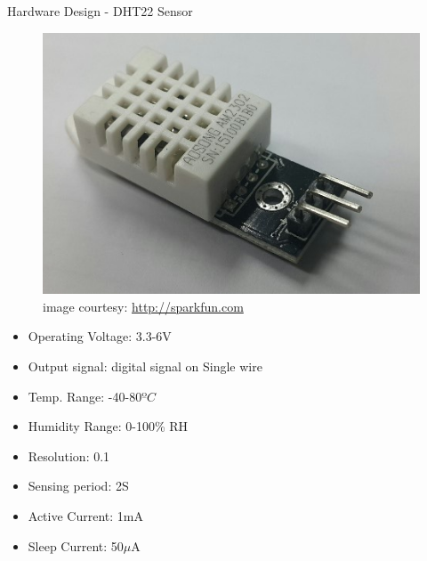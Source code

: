 \documentclass[t]{beamer} %
\begin{document}
\begin{frame}{Hardware Design - DHT22 Sensor}
\fboxsep=0pt
\noindent
\begin{minipage}[t]{0.48\linewidth}
\begin{figure}[!ht]
	\centering
\includegraphics[scale=0.3]{DHT22}
\caption{\tiny image courtesy: \url{http://sparkfun.com}}
\label{fig:dht22}
\end{figure}
\end{minipage}
\hfill
\begin{minipage}[t]{0.48\linewidth}
\begin{itemize}
\item Operating Voltage: 3.3-6V
\item Output signal: digital signal on Single wire 
\item Temp. Range: -40-80$ºC$
\item Humidity Range: 0-100\% RH
\item Resolution: 0.1
\item Sensing period: 2S
\item Active Current: 1mA
\item Sleep Current: 50$\mu$A
\end{itemize}
\end{minipage}
\end{frame}
\end{document}
